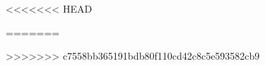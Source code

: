 
\raggedbottom

<<<<<<< HEAD
\tableofcontents



=======
\tableofcontents*



>>>>>>> c7558bb365191bdb80f110cd42c8c5e593582cb9
\begingroup
	\raggedright
	
\endgroup


